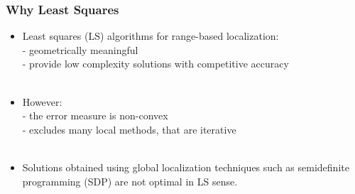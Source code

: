 \documentclass [t] {beamer} %
\begin{document}





\begin{frame} %
\frametitle{Why Least Squares}
\phantom{m}
\begin{itemize}
\item
Least squares (LS) algorithms for range-based localization:\\
- geometrically meaningful\\
- provide low complexity solutions with competitive accuracy
\\~\\
\item
However:\\
- the error measure is non-convex\\
- excludes many local methods, that are iterative
\\~\\
\item
Solutions obtained using global localization techniques such as
semidefinite programming (SDP) are not optimal in LS sense.
\end{itemize}
\end{frame}
\end{document}
